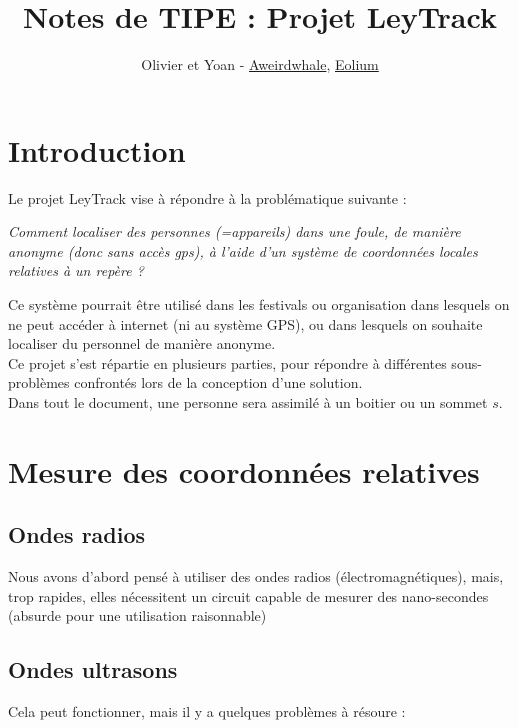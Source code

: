 \documentclass{article}
\title{Notes de TIPE : Projet LeyTrack}
\author{Olivier et Yoan - \href{https://github.com/aweirdwhale}{Aweirdwhale}, \href{https://github.com/eolium}{Eolium}}
\begin{document}
\maketitle

\section*{Introduction}

Le projet LeyTrack vise à répondre à la problématique suivante :

\bigskip

\emph{
Comment localiser des personnes (=appareils) dans une foule, de manière anonyme (donc sans accès gps), à l'aide d'un système de coordonnées locales relatives à un repère ?
}

\bigskip

Ce système pourrait être utilisé dans les festivals ou organisation dans lesquels on ne peut accéder à internet (ni au système GPS), ou dans lesquels on souhaite localiser du personnel de manière anonyme.
\\
Ce projet s'est répartie en plusieurs parties, pour répondre à différentes sous-problèmes confrontés lors de la conception d'une solution.
\\
Dans tout le document, une personne sera assimilé à un boitier ou un sommet $s$.


\section{Mesure des coordonnées relatives}

\subsection{Ondes radios}

Nous avons d'abord pensé à utiliser des ondes radios (électromagnétiques), mais, trop rapides, elles nécessitent un circuit capable de mesurer des nano-secondes (absurde pour une utilisation raisonnable)

\bigskip

\subsection{Ondes ultrasons}


Cela peut fonctionner, mais il y a quelques problèmes à résoure :
\end{document}
